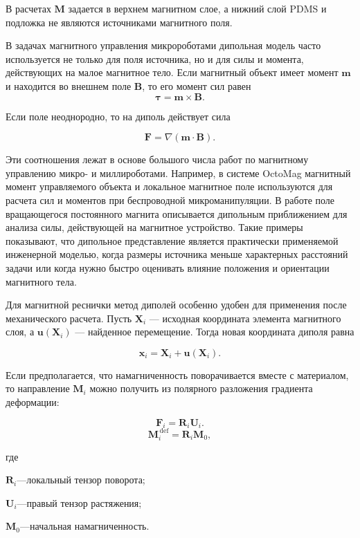 \documentclass[14pt,a4paper]{extarticle}
\newif\ifwherefirst
\newcommand{\whereitem}[2]{%
    \ifwherefirst
        \wherefirstfalse
        #1\hspace{0.25em}---\hspace{0.25em}#2\par
    \else
        \noindent\hspace*{\parindent}\hphantom{где\enspace}#1\hspace{0.25em}---\hspace{0.25em}#2\par
    \fi
}
\newenvironment{whereblock}{%
    \vspace*{-1.55\baselineskip}%
    \begingroup
    \singlespacing
    \wherefirsttrue
    \par\indent где\enspace\ignorespaces
}{%
    \par\endgroup
    \par\vspace{\baselineskip}
}
\begin{document}
В расчетах \(\mathbf{M}\) задается в верхнем магнитном слое, а нижний слой PDMS и подложка не являются источниками магнитного поля.

В задачах магнитного управления микророботами дипольная модель часто используется не только для поля источника, но и для силы и момента, действующих на малое магнитное тело. Если магнитный объект имеет момент \(\mathbf{m}\) и находится во внешнем поле \(\mathbf{B}\), то его момент сил равен
\begin{equation}
    \boldsymbol{\tau}
    =
    \mathbf{m}\times\mathbf{B}.
\end{equation}

Если поле неоднородно, то на диполь действует сила

\begin{equation}
    \mathbf{F}
    =
    \nabla\left(\mathbf{m}\cdot\mathbf{B}\right).
\end{equation}

Эти соотношения лежат в основе большого числа работ по магнитному управлению микро- и миллироботами. Например, в системе OctoMag \cite{kummer2010} магнитный момент управляемого объекта и локальное магнитное поле используются для расчета сил и моментов при беспроводной микроманипуляции. В работе \cite{mahoney2011} поле вращающегося постоянного магнита описывается дипольным приближением для анализа силы, действующей на магнитное устройство. Такие примеры показывают, что дипольное представление является практически применяемой инженерной моделью, когда размеры источника меньше характерных расстояний задачи или когда нужно быстро оценивать влияние положения и ориентации магнитного тела.

Для магнитной реснички метод диполей особенно удобен для применения после механического расчета. Пусть \(\mathbf{X}_i\) --- исходная координата элемента магнитного слоя, а \(\mathbf{u}(\mathbf{X}_i)\) --- найденное перемещение. Тогда новая координата диполя равна

\begin{equation}
    \mathbf{x}_i = \mathbf{X}_i + \mathbf{u}(\mathbf{X}_i).
\end{equation}

Если предполагается, что намагниченность поворачивается вместе с материалом, то направление \(\mathbf{M}_i\) можно получить из полярного разложения градиента деформации:

\begin{equation}
    \mathbf{F}_i = \mathbf{R}_i\mathbf{U}_i.
\end{equation}
\begin{equation}
    \mathbf{M}_i^{\,\mathrm{def}}
    =
    \mathbf{R}_i\mathbf{M}_0,
\end{equation}
\begin{whereblock}
\whereitem{\(\mathbf{R}_i\)}{локальный тензор поворота;}
\whereitem{\(\mathbf{U}_i\)}{правый тензор растяжения;}
\whereitem{\(\mathbf{M}_0\)}{начальная намагниченность.}
\end{whereblock}
\end{document}
